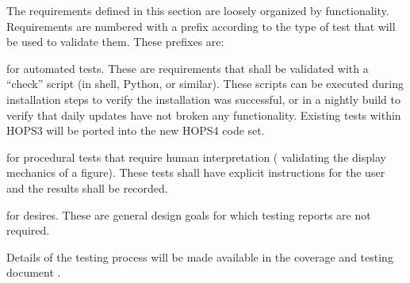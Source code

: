 The requirements defined in this section are loosely organized by functionality.
Requirements are numbered with a prefix according to
the type of test that will be used to validate them.  These prefixes are:
\begin{description}
[align=left, labelwidth=0.0cm, leftmargin=1cm]
\item[A,] for automated tests. These are requirements
that shall be validated with a ``check'' script (in shell, Python, or similar).
These scripts can be executed during installation steps to verify the
installation was successful,
or in a nightly build to verify that daily updates have not broken any
functionality. Existing tests within HOPS3 will be ported into the new
HOPS4 code set.


\item[P,] for procedural tests that require human interpretation (\eg
validating the display mechanics of a figure). These tests shall have
explicit instructions for the user and the results shall be recorded.

\item[D,] for desires. These are general design goals for which testing reports are not required.


\end{description}

Details of the testing process will be made available in the coverage
and testing document \cite{cover}.





